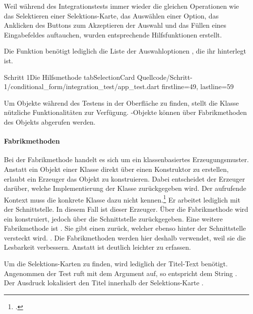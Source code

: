 Weil während des Integrationstests immer wieder die gleichen Operationen wie das Selektieren einer Selektions-Karte, das Auswählen einer Option, das Anklicken des Buttons zum Akzeptieren der Auswahl und das Füllen eines Eingabefeldes auftauchen, wurden entsprechende Hilfsfunktionen erstellt.


Die Funktion  \Lst{\ref{lst:Schritt1HilfsmethodeTabSelectionCard}} benötigt lediglich die Liste der Auswahloptionen , die ihr hinterlegt ist.
 

\begin{alexlisting}{Schritt 1}{Die Hilfsmethode tabSelectionCard}
  {Quellcode/Schritt-1/conditional_form/integration_test/app_test.dart}
  {firstline=49, lastline=59}
  \label{lst:Schritt1HilfsmethodeTabSelectionCard}
\end{alexlisting}

Um Objekte während des Testens in der Oberfläche zu finden, stellt die Klasse  nützliche Funktionalitäten zur Verfügung.
-Objekte können über Fabrikmethoden des Objekts  abgerufen werden.

\paragraph{Fabrikmethoden}
Bei der Fabrikmethode handelt es sich um ein klassenbasiertes Erzeugungsmuster.
Anstatt ein Objekt einer Klasse direkt über einen Konstruktor zu erstellen, erlaubt ein Erzeuger das Objekt zu konstruieren.
Dabei entscheidet der Erzeuger darüber, welche Implementierung der Klasse zurückgegeben wird.
Der aufrufende Kontext muss die konkrete Klasse dazu nicht kennen.\footcite[Vgl.][107-116]{gamma2009entwurfsmuster} Er arbeitet lediglich mit der Schnittstelle. In diesem Fall ist  dieser Erzeuger. Über die Fabrikmethode  wird ein  konstruiert, jedoch über die Schnittstelle  zurückgegeben. Eine weitere Fabrikmethode ist . Sie gibt einen  zurück, welcher ebenso hinter der Schnittstelle  versteckt wird. . Die Fabrikmethoden werden hier deshalb verwendet, weil sie die Lesbarkeit verbessern. Anstatt  ist  deutlich leichter zu erfassen.



Um die Selektions-Karten zu finden, wird lediglich der Titel-Text benötigt.
Angenommen der Test ruft  mit dem Argument  auf, so entspricht  dem String . Der Ausdruck  lokalisiert den Titel innerhalb der Selektions-Karte .

